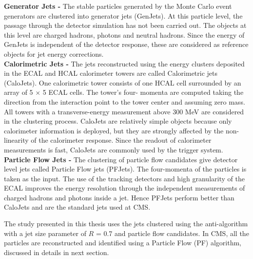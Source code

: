 {\bf Generator Jets -} The stable particles generated by the Monte Carlo event generators are clustered into generator jets (GenJets). At this particle level, the passage through the detector simulation has not been carried out. The objects at this level are charged hadrons, photons and neutral hadrons. Since the energy of GenJets is independent of the detector response, these are considered as reference objects for jet energy corrections. \\ \newline
{\bf Calorimetric Jets -} The jets reconstructed using the energy clusters deposited in the ECAL and HCAL calorimeter towers are called Calorimetric jets (CaloJets). One calorimetric tower consists of one HCAL cell surrounded by an array of 5 $\times$ 5 ECAL cells. The tower’s four- momenta are computed taking the direction from the interaction point to the tower center and assuming zero mass. All towers with a transverse-energy measurement above 300 MeV are considered in the clustering process. CaloJets are relatively simple objects because only calorimeter information is deployed, but they are strongly affected by the non-linearity of the calorimeter response. Since the readout of calorimeter measurements is fast, CaloJets are commonly used by the trigger system. \\ \newline
{\bf Particle Flow Jets -} The clustering of particle flow candidates give detector level jets called Particle Flow jets (PFJets). The four-momenta of the particles is taken as the input. The use of the tracking detectors and high granularity of the ECAL improves the energy resolution through the independent measurements of charged hadrons and photons inside a jet. Hence PFJets perform better than CaloJets and are the standard jets used at CMS.

The study presented in this thesis uses the jets clustered using the anti-\kt algorithm with a jet size parameter of $R$ = 0.7 and particle flow candidates. In CMS, all the particles are reconstructed and identified using a Particle Flow (PF) algorithm, discussed in details in next section.  

